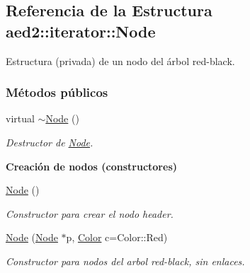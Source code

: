 \hypertarget{structaed2_1_1iterator_1_1Node}{}\subsection{Referencia de la Estructura aed2\+:\+:iterator\+:\+:Node}
\label{structaed2_1_1iterator_1_1Node}


Estructura (privada) de un nodo del árbol red-\/black.  


\subsubsection*{Métodos públicos}
\begin{DoxyCompactItemize}
\item 
virtual \hyperlink{structaed2_1_1iterator_1_1Node_ab9a8f2970d15b72a4d1d20f8bf853d4b_ab9a8f2970d15b72a4d1d20f8bf853d4b}{$\sim$\+Node} ()
\begin{DoxyCompactList}\small\item\em Destructor de \hyperlink{structaed2_1_1iterator_1_1Node}{Node}. \end{DoxyCompactList}\end{DoxyCompactItemize}
\begin{Indent}\textbf{ Creación de nodos (constructores)}\par
\begin{DoxyCompactItemize}
\item 
\hyperlink{structaed2_1_1iterator_1_1Node_a143f108a38e8990d7d60ad48dd521654_a143f108a38e8990d7d60ad48dd521654}{Node} ()
\begin{DoxyCompactList}\small\item\em Constructor para crear el nodo header. \end{DoxyCompactList}\item 
\hyperlink{structaed2_1_1iterator_1_1Node_a1f7307020ba416915f60d2dd938df845_a1f7307020ba416915f60d2dd938df845}{Node} (\hyperlink{structaed2_1_1iterator_1_1Node}{Node} $\ast$p, \hyperlink{classaed2_1_1iterator_aaa188f82ba585d8de525b1400242cf4f_aaa188f82ba585d8de525b1400242cf4f}{Color} c=Color\+::\+Red)
\begin{DoxyCompactList}\small\item\em Constructor para nodos del arbol red-\/black, sin enlaces. \end{DoxyCompactList}\end{DoxyCompactItemize}
\end{Indent}
